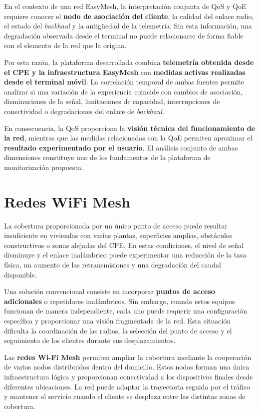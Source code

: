 En el contexto de una red EasyMesh, la interpretación conjunta de QoS y
QoE requiere conocer el \textbf{nodo de asociación del cliente}, la
calidad del enlace radio, el estado del \textit{backhaul} y la antigüedad
de la telemetría. Sin esta información, una degradación observada desde el
terminal no puede relacionarse de forma fiable con el elemento de la red
que la origina.

Por esta razón, la plataforma desarrollada combina
\textbf{telemetría obtenida desde el CPE y la infraestructura EasyMesh}
con \textbf{medidas activas realizadas desde el terminal móvil}. La
correlación temporal de ambas fuentes permite analizar si una variación
de la experiencia coincide con cambios de asociación, disminuciones de
la señal, limitaciones de capacidad, interrupciones de conectividad o
degradaciones del enlace de \textit{backhaul}.

En consecuencia, la QoS proporciona la
\textbf{visión técnica del funcionamiento de la red}, mientras que las
medidas relacionadas con la QoE permiten aproximar el
\textbf{resultado experimentado por el usuario}. El análisis conjunto de
ambas dimensiones constituye uno de los fundamentos de la plataforma de
monitorización propuesta.

\section{Redes WiFi Mesh}
\label{sec:redes-wifi-mesh}

La cobertura proporcionada por un único punto de acceso puede resultar
insuficiente en viviendas con varias plantas, superficies amplias,
obstáculos constructivos o zonas alejadas del CPE. En estas condiciones,
el nivel de señal disminuye y el enlace inalámbrico puede experimentar
una reducción de la tasa física, un aumento de las retransmisiones y una
degradación del caudal disponible.

Una solución convencional consiste en incorporar
\textbf{puntos de acceso adicionales} o repetidores inalámbricos. Sin
embargo, cuando estos equipos funcionan de manera independiente, cada
uno puede requerir una configuración específica y proporcionar una
visión fragmentada de la red. Esta situación dificulta la coordinación
de las radios, la selección del punto de acceso y el seguimiento de los
clientes durante sus desplazamientos.

Las \textbf{redes Wi-Fi Mesh} permiten ampliar la cobertura mediante la
cooperación de varios nodos distribuidos dentro del domicilio. Estos
nodos forman una única infraestructura lógica y proporcionan
conectividad a los dispositivos finales desde diferentes ubicaciones. La
red puede adaptar la trayectoria seguida por el tráfico y mantener el
servicio cuando el cliente se desplaza entre las distintas zonas de
cobertura.

